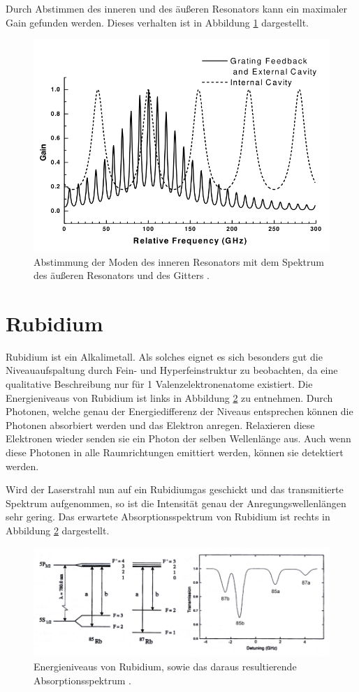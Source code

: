 Durch Abstimmen des inneren und des äußeren Resonators kann ein maximaler Gain gefunden werden. Dieses verhalten ist in Abbildung \ref{fig:moden} dargestellt.

\begin{figure}
    \centering
    \includegraphics[scale=0.55]{bilder/moden.png}
    \caption{Abstimmung der Moden des inneren Resonators mit dem Spektrum des äußeren Resonators und des Gitters \cite{diode_laser_spectroscopy}.}
    \label{fig:moden}
\end{figure}

\section{Rubidium}
\label{sec:rub}

Rubidium ist ein Alkalimetall. Als solches eignet es sich besonders gut die Niveauaufspaltung durch Fein- und Hyperfeinstruktur zu beobachten, da eine qualitative Beschreibung nur 
für 1 Valenzelektronenatome existiert. Die Energieniveaus von Rubidium ist links in Abbildung \ref{fig:spektrum_rubidium} zu entnehmen. Durch Photonen, welche genau der Energiedifferenz der Niveaus 
entsprechen können die Photonen absorbiert werden und das Elektron anregen. Relaxieren diese Elektronen wieder senden sie ein Photon der selben Wellenlänge aus. Auch wenn diese 
Photonen in alle Raumrichtungen emittiert werden, können sie detektiert werden.

Wird der Laserstrahl nun auf ein Rubidiumgas geschickt und das transmitierte Spektrum aufgenommen, so ist die Intensität genau der Anregungswellenlängen sehr gering. Das erwartete 
Absorptionsspektrum von Rubidium ist rechts in Abbildung \ref{fig:spektrum_rubidium} dargestellt.

\begin{figure}
    \centering
    \includegraphics[scale=0.55]{bilder/spektrum_rubidium.png}
    \caption{Energieniveaus von Rubidium, sowie das daraus resultierende Absorptionsspektrum \cite{diode_laser_spectroscopy}.}
    \label{fig:spektrum_rubidium}
\end{figure}
